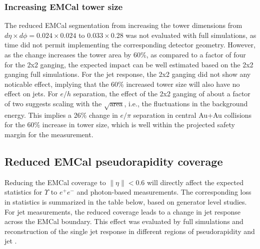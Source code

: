 \subsubsection{Increasing EMCal tower size}
The reduced EMCal segmentation from increasing the tower dimensions
from $d\eta \times d\phi = 0.024 \times 0.024$ to $0.033 \times 0.28$
was not evaluated with full \geant simulations, as time did not permit
implementing the corresponding detector geometry. However, as the
change increases the tower area by 60\%, as compared to a factor of
four for the 2x2 ganging, the expected impact can be well estimated
based on the 2x2 ganging full simulations. For the jet response, the
2x2 ganging did not show any noticable effect, implying that the 60\%
increased tower size will also have no effect on jets. For $e/h$
separation, the effect of the 2x2 ganging of about a factor of two
suggests scaling with the $\sqrt{\mbox{area}}$, i.e., the fluctuations
in the background energy. This implies a 26\% change in $e/\pi$
separation in central Au+Au collisions for the 60\% increase in tower
size, which is well within the projected safety margin for the
measurement.

\subsection{Reduced EMCal pseudorapidity coverage}
Reducing the EMCal coverage to $\| \eta \| < 0.6$ will directly affect
the expected statistics for $\Upsilon$ to $e^+ e^-$ and photon-based
measurements. The corresponding loss in statistics is summarized in
the table below, based on generator level studies. For jet
measurements, the reduced coverage leads to a change in jet response
across the EMCal boundary. This effect was evaluated by full \geant
simulations and reconstruction of the single jet response in different
regions of pseudorapidity and jet \pt.


